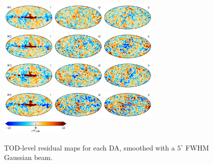 \documentclass[twocolumn]{../../common/aa}
\begin{document}
\begin{figure}
	\includegraphics[width=0.7\textwidth]{figures/tod_res_W1_IQU.pdf}\\
	\includegraphics[width=0.7\textwidth]{figures/tod_res_W2_IQU.pdf}\\
	\includegraphics[width=0.7\textwidth]{figures/tod_res_W3_IQU.pdf}\\
	\includegraphics[width=0.7\textwidth]{figures/tod_res_W4_IQU.pdf}\\
	\includegraphics[width=0.30\textwidth]{figures/cbar_10uK.pdf}
	\caption{TOD-level residual maps for each DA, smoothed with a $5^\circ$ FWHM Gaussian beam.}
        \label{fig:todres}
\end{figure}
\end{document}
